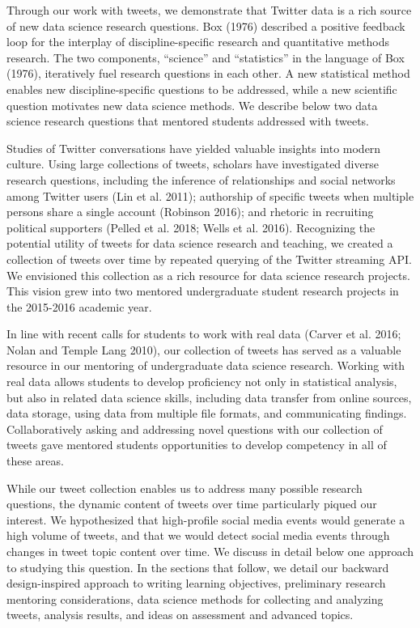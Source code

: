 \documentclass[
]{article}
\begin{document}
Through our work with tweets, we demonstrate
that Twitter data is a rich source of new data science research questions.
Box (1976) described a
positive feedback loop for the interplay of discipline-specific research
and quantitative methods research. The two components, ``science'' and ``statistics'' in the
language of Box (1976), iteratively fuel research questions in each other.
A new statistical
method enables new discipline-specific questions to be addressed, while a new
scientific question motivates new data science methods. We describe below two
data science research questions that mentored students addressed with tweets.

Studies of Twitter conversations have yielded valuable insights into
modern culture. Using large collections of tweets, scholars have
investigated diverse research questions, including
the inference of relationships and social networks among Twitter users (Lin et al. 2011);
authorship of specific tweets when multiple persons share a single account (Robinson 2016); and
rhetoric in recruiting political supporters (Pelled et al. 2018; Wells et al. 2016).
Recognizing the potential utility of tweets for data science research and teaching,
we created a collection of tweets over time by repeated querying of the Twitter streaming API.
We envisioned this collection as a rich resource for data science research projects. This vision
grew into two mentored undergraduate student research projects in the 2015-2016 academic year.

In line with recent calls for students to work with real data (Carver et al. 2016; Nolan and Temple Lang 2010), our
collection of tweets has served as a valuable resource in our mentoring
of undergraduate data science research.
Working with real data allows students to develop proficiency not
only in statistical analysis,
but also in related data science skills, including data
transfer from online sources, data storage, using data
from multiple file formats, and communicating findings.
Collaboratively asking and addressing novel questions with
our collection of tweets gave mentored students
opportunities to develop competency in all of these areas.

While our tweet collection enables us to address many possible research questions, the
dynamic content of tweets over time particularly piqued our interest.
We hypothesized that high-profile social media events would generate a high volume of
tweets, and that we would detect social media events through changes in tweet
topic content over time. We discuss in detail below one approach to studying this
question. In the sections that follow, we detail our backward design-inspired approach to
writing learning objectives, preliminary research mentoring considerations,
data science methods for collecting and analyzing tweets, analysis results,
and ideas on assessment and advanced topics.
\end{document}
